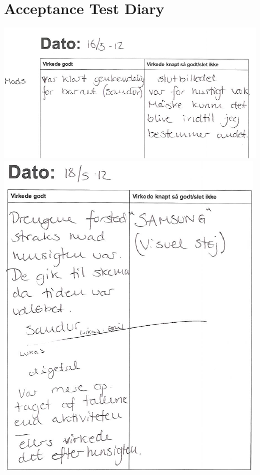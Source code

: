 	\section{Acceptance Test Diary}
	\label{sec:acceptance}
	\begin{center}
		\includegraphics[width=\textwidth]{Development/Acceptance_diary/Diary_1.png}
		\includegraphics[width=\textwidth]{Development/Acceptance_diary/Diary_2.png}
	\end{center}
	
